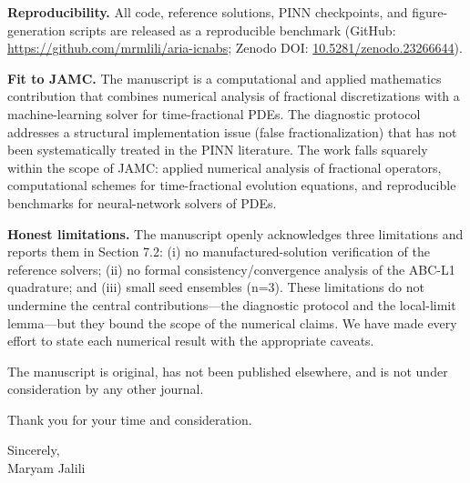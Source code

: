 \documentclass[11pt,a4paper]{article}
\begin{document}
\textbf{Reproducibility.} All code, reference solutions, PINN checkpoints, and figure-generation scripts are released as a reproducible benchmark (GitHub: \url{https://github.com/mrmlili/aria-icnabs}; Zenodo DOI: \href{https://doi.org/10.5281/zenodo.23266644}{10.5281/zenodo.23266644}).

\textbf{Fit to JAMC.} The manuscript is a computational and applied mathematics contribution that combines numerical analysis of fractional discretizations with a machine-learning solver for time-fractional PDEs. The diagnostic protocol addresses a structural implementation issue (false fractionalization) that has not been systematically treated in the PINN literature. The work falls squarely within the scope of JAMC: applied numerical analysis of fractional operators, computational schemes for time-fractional evolution equations, and reproducible benchmarks for neural-network solvers of PDEs.

\textbf{Honest limitations.} The manuscript openly acknowledges three limitations and reports them in Section 7.2: (i) no manufactured-solution verification of the reference solvers; (ii) no formal consistency/convergence analysis of the ABC-L1 quadrature; and (iii) small seed ensembles (n=3). These limitations do not undermine the central contributions---the diagnostic protocol and the local-limit lemma---but they bound the scope of the numerical claims. We have made every effort to state each numerical result with the appropriate caveats.

The manuscript is original, has not been published elsewhere, and is not under consideration by any other journal.

Thank you for your time and consideration.

Sincerely, \\
Maryam Jalili
\end{document}
